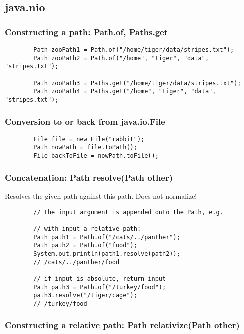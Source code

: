 \documentclass{scrartcl}
\begin{document}
\subsection{java.nio}

\subsubsection{Constructing a path: Path.of, Paths.get}

    \begin{lstlisting}
        Path zooPath1 = Path.of("/home/tiger/data/stripes.txt");
        Path zooPath2 = Path.of("/home", "tiger", "data", "stripes.txt");

        Path zooPath3 = Paths.get("/home/tiger/data/stripes.txt");
        Path zooPath4 = Paths.get("/home", "tiger", "data", "stripes.txt");
    \end{lstlisting}

\subsubsection{Conversion to or back from java.io.File}

    \begin{lstlisting}
        File file = new File("rabbit");
        Path nowPath = file.toPath();
        File backToFile = nowPath.toFile();
    \end{lstlisting}

\subsubsection{Concatenation: Path resolve(Path other)}

    Resolves the given path against this path. Does not normalize!

    \begin{lstlisting}
        // the input argument is appended onto the Path, e.g.

        // with input a relative path:
        Path path1 = Path.of("/cats/../panther");
        Path path2 = Path.of("food");
        System.out.println(path1.resolve(path2));
        // /cats/../panther/food

        // if input is absolute, return input
        Path path3 = Path.of("/turkey/food");
        path3.resolve("/tiger/cage");
        // /turkey/food
    \end{lstlisting}

\subsubsection{Constructing a relative path: Path relativize(Path other)}
\end{document}
